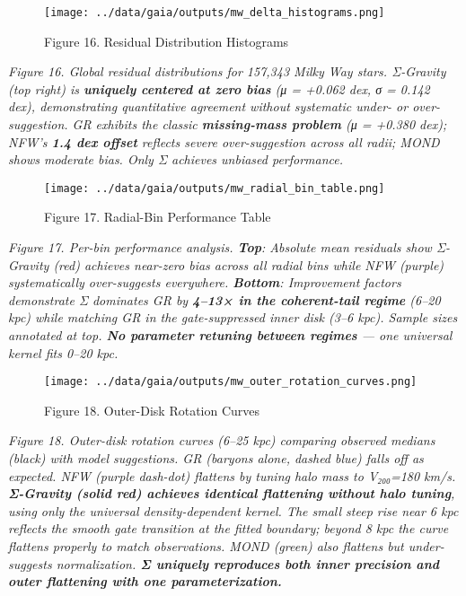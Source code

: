 \documentclass[11pt,a4paper]{article}
\begin{document}
\begin{figure}[h]
\centering
\texttt{[image: ../data/gaia/outputs/mw\_delta\_histograms.png]}
\caption{Figure 16. Residual Distribution Histograms}
\end{figure}


\textit{Figure 16. Global residual distributions for 157,343 Milky Way stars. Σ-Gravity (top right) is \textbf{uniquely centered at zero bias} (μ = +0.062 dex, σ = 0.142 dex), demonstrating quantitative agreement without systematic under- or over-suggestion. GR exhibits the classic \textbf{missing-mass problem} (μ = +0.380 dex); NFW's \textbf{1.4 dex offset} reflects severe over-suggestion across all radii; MOND shows moderate bias. Only Σ achieves unbiased performance.}


\begin{figure}[h]
\centering
\texttt{[image: ../data/gaia/outputs/mw\_radial\_bin\_table.png]}
\caption{Figure 17. Radial-Bin Performance Table}
\end{figure}


\textit{Figure 17. Per-bin performance analysis. \textbf{Top}: Absolute mean residuals show Σ-Gravity (red) achieves near-zero bias across all radial bins while NFW (purple) systematically over-suggests everywhere. \textbf{Bottom}: Improvement factors demonstrate Σ dominates GR by \textbf{4–13× in the coherent-tail regime} (6–20 kpc) while matching GR in the gate-suppressed inner disk (3–6 kpc). Sample sizes annotated at top. \textbf{No parameter retuning between regimes} — one universal kernel fits 0–20 kpc.}


\begin{figure}[h]
\centering
\texttt{[image: ../data/gaia/outputs/mw\_outer\_rotation\_curves.png]}
\caption{Figure 18. Outer-Disk Rotation Curves}
\end{figure}


\textit{Figure 18. Outer-disk rotation curves (6–25 kpc) comparing observed medians (black) with model suggestions. GR (baryons alone, dashed blue) falls off as expected. NFW (purple dash-dot) flattens by tuning halo mass to V₂₀₀=180 km/s. \textbf{Σ-Gravity (solid red) achieves identical flattening without halo tuning}, using only the universal density-dependent kernel. The small steep rise near 6 kpc reflects the smooth gate transition at the fitted boundary; beyond 8 kpc the curve flattens properly to match observations. MOND (green) also flattens but under-suggests normalization. \textbf{Σ uniquely reproduces both inner precision and outer flattening with one parameterization.}}
\end{document}
